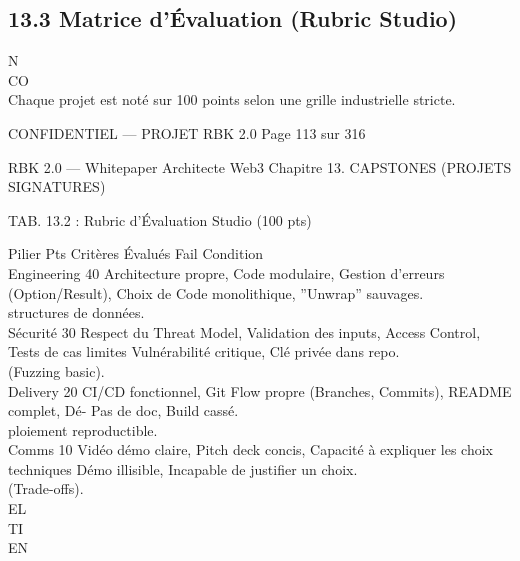 \documentclass[12pt,landscape,a4paper]{article}
\newenvironment{confidential}
{\begin{tcolorbox}[
    colback=rbkred!5!white,
    colframe=rbkred!75!black,
    title=CONFIDENTIEL,
    fonttitle=\bfseries\color{white},
    coltitle=rbkred!75!black,
    breakable,
    enhanced,
    frame hidden,
    borderline west={2pt}{0pt}{rbkred!75!black}
]}
{\end{tcolorbox}}
\begin{document}
\subsection{13.3 Matrice d’Évaluation (Rubric Studio)}
N\\
CO\\
Chaque projet est noté sur 100 points selon une grille industrielle stricte.\\
\vspace{0.5em}
\vspace{0.5em}
\vspace{0.5em}
\vspace{0.5em}
\begin{confidential}CONFIDENTIEL — PROJET RBK 2.0                                 Page 113 sur 316\end{confidential}
RBK 2.0 — Whitepaper Architecte Web3                                                          Chapitre 13. CAPSTONES (PROJETS SIGNATURES)\\
\vspace{0.5em}
\vspace{0.5em}
\begin{center}\begin{tabular}TAB. 13.2 : Rubric d’Évaluation Studio (100 pts)\end{tabular}\end{center}
\vspace{0.5em}
\vspace{0.5em}
Pilier      Pts Critères Évalués                                                                    Fail Condition\\
Engineering 40 Architecture propre, Code modulaire, Gestion d’erreurs (Option/Result), Choix de Code monolithique, ”Unwrap” sauvages.\\
structures de données.\\
Sécurité    30 Respect du Threat Model, Validation des inputs, Access Control, Tests de cas limites Vulnérabilité critique, Clé privée dans repo.\\
(Fuzzing basic).\\
Delivery    20 CI/CD fonctionnel, Git Flow propre (Branches, Commits), README complet, Dé- Pas de doc, Build cassé.\\
ploiement reproductible.\\
Comms       10 Vidéo démo claire, Pitch deck concis, Capacité à expliquer les choix techniques Démo illisible, Incapable de justifier un choix.\\
(Trade-offs).\\
\vspace{0.5em}
\vspace{0.5em}
\vspace{0.5em}
\vspace{0.5em}
EL\\
TI\\
EN\\
\end{document}
